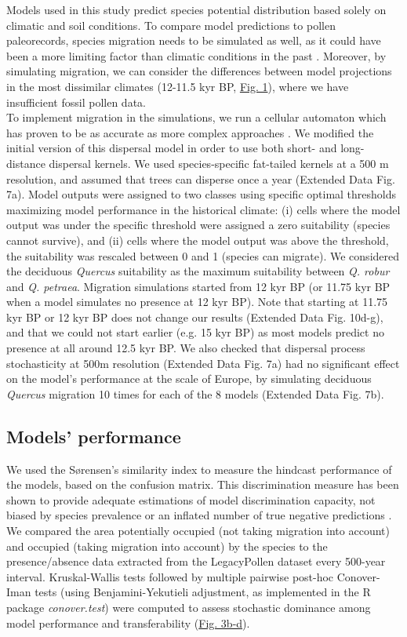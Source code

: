 \documentclass[pdflatex, sn-nature]{sn-jnl}%
\newcommand{\textappr}{\raisebox{0.5ex}{\texttildelow}} %
\begin{document}
Models used in this study predict species potential distribution based solely on climatic and soil conditions. To compare model predictions to pollen paleorecords, species migration needs to be simulated as well, as it could have been a more limiting factor than climatic conditions in the past \cite{Svenning2004, Saltre2013}. Moreover, by simulating migration, we can consider the differences between model projections in the most dissimilar climates (12-11.5 kyr BP, \hyperref[climatic_dissimilarity]{Fig. 1}), where we have insufficient fossil pollen data. \\
To implement migration in the simulations, we run a  cellular automaton \cite{Engler2012} which has proven to be as accurate as more complex approaches \cite{Zurell2016}. We modified the initial version of this dispersal model in order to use both short- and long-distance dispersal kernels. We used species-specific fat-tailed kernels \cite{Zani2022} at a 500 m resolution, and assumed that trees can disperse once a year (Extended Data Fig. 7a). Model outputs were assigned to two classes using specific optimal thresholds maximizing model performance in the historical climate: (i) cells where the model output was under the specific threshold were assigned a zero suitability (species cannot survive), and (ii) cells where the  model output was above the threshold, the suitability was rescaled between 0 and 1 (species can migrate). We considered the deciduous \emph{Quercus} suitability as the maximum suitability between \emph{Q. robur} and \emph{Q. petraea}. Migration simulations started from 12 kyr BP (or 11.75 kyr BP when a model simulates no presence at 12 kyr BP). Note that starting at 11.75 kyr BP or 12 kyr BP does not change our results (Extended Data Fig. 10d-g), and that we could not start earlier (e.g. \textappr15 kyr BP) as most models predict no presence at all around 12.5 kyr BP. We also checked that dispersal process stochasticity at 500m resolution (Extended Data Fig. 7a) had no significant effect on the model's performance at the scale of Europe, by simulating deciduous \emph{Quercus} migration 10 times for each of the 8 models (Extended Data Fig. 7b). 

\subsection{Models' performance}\label{skill}

We used the Sørensen's similarity index to measure the hindcast performance of the models, based on the confusion matrix. This discrimination measure has been shown to provide adequate estimations of model discrimination capacity,  not biased by species prevalence or an inflated number of true negative predictions \cite{Leroy2018}. We compared the area potentially occupied (not taking migration into account) and occupied (taking migration into account) by the species to the presence/absence data extracted from the LegacyPollen dataset every 500-year interval. Kruskal-Wallis tests followed by multiple pairwise post-hoc Conover-Iman tests (using Benjamini-Yekutieli adjustment, as implemented in the R package \emph{conover.test}) were computed to assess stochastic dominance among model performance and transferability (\hyperref[past_performance]{Fig. 3b-d}).
\end{document}
